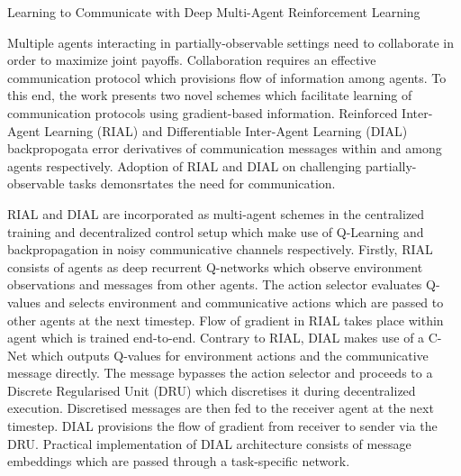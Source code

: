 \documentclass[11pt,letterpaper]{article}
\begin{document}
\begin{center}
  \large{Learning to Communicate with Deep Multi-Agent Reinforcement Learning}
\end{center}

Multiple agents interacting in partially-observable settings need to collaborate in order to maximize joint payoffs. Collaboration requires an effective communication protocol which provisions flow of information among agents. To this end, the work presents two novel schemes which facilitate learning of communication protocols using gradient-based information. Reinforced Inter-Agent Learning (RIAL) and  Differentiable Inter-Agent Learning (DIAL) backpropogata error derivatives of communication messages within and among agents respectively. Adoption of RIAL and DIAL on challenging partially-observable tasks demonsrtates the need for communication. 

RIAL and DIAL are incorporated as multi-agent schemes in the centralized training and decentralized control setup which make use of Q-Learning and backpropagation in noisy communicative channels respectively. Firstly, RIAL consists of agents as deep recurrent Q-networks  which observe environment observations and messages from other agents. The action selector evaluates Q-values and selects environment and communicative actions which are passed to other agents at the next timestep. Flow of gradient in RIAL takes place within agent which is trained end-to-end. Contrary to RIAL, DIAL makes use of a C-Net which outputs Q-values for environment actions and the communicative message directly. The message bypasses the action selector and proceeds to a Discrete Regularised Unit (DRU) which discretises it during decentralized execution. Discretised messages are then fed to the receiver agent at the next timestep. DIAL provisions the flow of gradient from receiver to sender via the DRU. Practical implementation of DIAL architecture consists of message embeddings which are passed through a task-specific network.  
\end{document}

